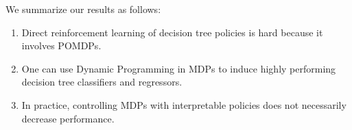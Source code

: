 We summarize our results as follows:

\begin{enumerate}
    \item Direct reinforcement learning of decision tree policies is hard because it involves POMDPs.
    \item One can use Dynamic Programming in MDPs to induce highly performing decision tree classifiers and regressors.
    \item In practice, controlling MDPs with interpretable policies does not necessarily decrease performance.
\end{enumerate}

        
        
        
        
        

        
        
